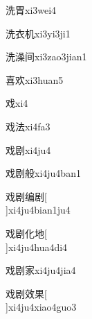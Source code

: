 \begin{verbete}[9;9]{洗胃}{xi3wei4}
\end{verbete}

\begin{verbete}[9;6;6]{洗衣机}{xi3yi3ji1}
\end{verbete}

\begin{verbete}[9;16;7]{洗澡间}{xi3zao3jian1}
\end{verbete}

\begin{verbete}[12;6]{喜欢}{xi3huan5}
\end{verbete}

\begin{verbete}[6]{戏}{xi4}
\end{verbete}

\begin{verbete}[6;8]{戏法}{xi4fa3}
\end{verbete}

\begin{verbete}[6;10]{戏剧}{xi4ju4}
\end{verbete}

\begin{verbete}[6;10;10]{戏剧般}{xi4ju4ban1}
\end{verbete}

\begin{verbete}[6;10;12;10]{戏剧编剧}[\\]{xi4ju4bian1ju4}
\end{verbete}

\begin{verbete}[6;10;4;6]{戏剧化地}[\\]{xi4ju4hua4di4}
\end{verbete}

\begin{verbete}[6;10;10]{戏剧家}{xi4ju4jia4}
\end{verbete}

\begin{verbete}[6;10;10;8]{戏剧效果}[\\]{xi4ju4xiao4guo3}
\end{verbete}


